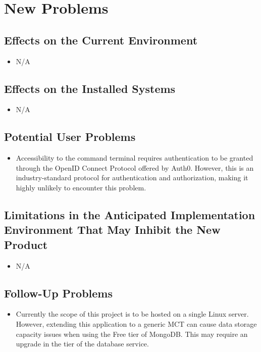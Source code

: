 \documentclass[12pt]{article}
\begin{document}
\section{New Problems}
\subsection{Effects on the Current Environment}
\begin{itemize}
    \item N/A
\end{itemize}

\subsection{Effects on the Installed Systems}
\begin{itemize}
    \item N/A
\end{itemize}

\subsection{Potential User Problems}
\begin{itemize}
    \item Accessibility to the command terminal requires authentication to be granted through the OpenID Connect Protocol offered by Auth0. However, this is an industry-standard protocol for authentication and authorization, making it highly unlikely to encounter this problem.
\end{itemize}

\subsection{Limitations in the Anticipated Implementation Environment That May
Inhibit the New Product}
\begin{itemize}
    \item N/A
\end{itemize}

\subsection{Follow-Up Problems}
\begin{itemize}
    \item Currently the scope of this project is to be hosted on a single Linux server. However, extending this application to a generic MCT can cause data storage capacity issues when using the Free tier of MongoDB. This may require an upgrade in the tier of the database service.
\end{itemize}
\end{document}
